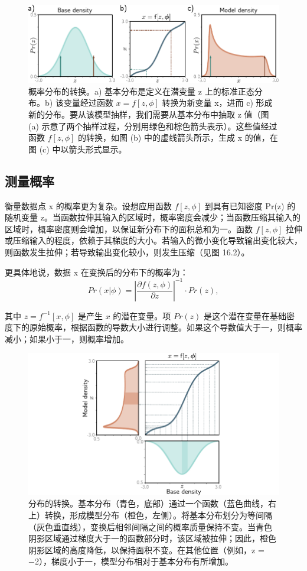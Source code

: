 \documentclass[lang=cn,newtx,10pt,scheme=chinese]{elegantbook}
\begin{document}
\begin{figure}[ht!]
\centering
\includegraphics[width=0.7\linewidth]{PDFFigures/UDLChap16PDF/FlowIntro.pdf}
\caption{概率分布的转换。a) 基本分布是定义在潜变量 z 上的标准正态分布。b) 该变量经过函数 \(x = f[z, \phi]\) 转换为新变量 x，进而 c) 形成新的分布。要从该模型抽样，我们需要从基本分布中抽取 z 值（图 (a) 示意了两个抽样过程，分别用绿色和棕色箭头表示）。这些值经过函数 \(f[z, \phi]\) 的转换，如图 (b) 中的虚线箭头所示，生成 x 的值，在图 (c) 中以箭头形式显示。}
\end{figure}

\subsection{测量概率}
衡量数据点 x 的概率更为复杂。设想应用函数 \(f[z, \phi]\) 到具有已知密度 Pr(z) 的随机变量 z。当函数拉伸其输入的区域时，概率密度会减少；当函数压缩其输入的区域时，概率密度则会增加，以保证新分布下的面积总和为一。函数 \(f[z,\phi]\) 拉伸或压缩输入的程度，依赖于其梯度的大小。若输入的微小变化导致输出变化较大，则函数发生拉伸；若导致输出变化较小，则发生压缩（见图 16.2）。

更具体地说，数据 x 在变换后的分布下的概率为：
\begin{equation}
Pr(x|\phi) = \left| \frac{\partial f(z, \phi)}{\partial z} \right|^{-1} \cdot Pr(z), 
\end{equation}

其中 \(z = f^{-1}[x, \phi]\) 是产生 \(x\) 的潜在变量。项 \(Pr(z)\) 是这个潜在变量在基础密度下的原始概率，根据函数的导数大小进行调整。如果这个导数值大于一，则概率减小；如果小于一，则概率增加。

\begin{figure}[ht!]
\centering
\includegraphics[width=0.7\linewidth]{PDFFigures/UDLChap16PDF/FlowIntroTransformDensity.pdf}
\caption{分布的转换。基本分布（青色，底部）通过一个函数（蓝色曲线，右上）转换，形成模型分布（橙色，左侧）。将基本分布划分为等间隔（灰色垂直线），变换后相邻间隔之间的概率质量保持不变。当青色阴影区域通过梯度大于一的函数部分时，该区域被拉伸；因此，橙色阴影区域的高度降低，以保持面积不变。在其他位置（例如，z = −2），梯度小于一，模型分布相对于基本分布有所增加。}
\end{figure}
\end{document}
